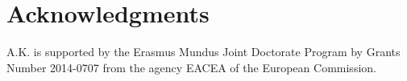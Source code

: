 \section*{Acknowledgments}
A.K. is supported by the Erasmus Mundus Joint Doctorate Program by Grants Number 2014-0707 from the agency EACEA of the European Commission.